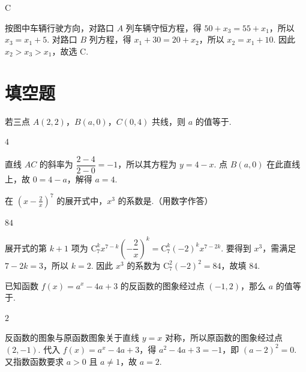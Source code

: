 \begin{answer}
C
\end{answer}

\begin{solution}
按图中车辆行驶方向，对路口 \(A\) 列车辆守恒方程，得 \(50+x_{3}=55+x_{1}\)，所以 \(x_{3}=x_{1}+5\). 对路口 \(B\) 列方程，得 \(x_{1}+30=20+x_{2}\)，所以 \(x_{2}=x_{1}+10\). 因此 \(x_{2}>x_{3}>x_{1}\)，故选 C.
\end{solution}

\section{填空题}
\begin{problem}
若三点 \(A(2,2)\)，\(B(a,0)\)，\(C(0,4)\) 共线，则 \(a\) 的值等于\fillinblank{}.
\end{problem}

\begin{answer}
\(4\)
\end{answer}

\begin{solution}
直线 \(AC\) 的斜率为 \(\dfrac{2-4}{2-0}=-1\)，所以其方程为 \(y=4-x\). 点 \(B(a,0)\) 在此直线上，故 \(0=4-a\)，解得 \(a=4\).
\end{solution}

\begin{problem}
在 \(\left(x - \frac{2}{x}\right)^7\) 的展开式中，\(x^3\) 的系数是\fillinblank{}.（用数字作答）
\end{problem}

\begin{answer}
\(84\)
\end{answer}

\begin{solution}
展开式的第 \(k+1\) 项为 \(\mathrm C_7^k x^{7-k}\left(-\dfrac{2}{x}\right)^k=\mathrm C_7^k(-2)^k x^{7-2k}\). 要得到 \(x^3\)，需满足 \(7-2k=3\)，所以 \(k=2\). 因此 \(x^3\) 的系数为 \(\mathrm C_7^2(-2)^2=84\)，故填 \(84\).
\end{solution}

\begin{problem}
已知函数 \( f(x) = a^x - 4a + 3 \) 的反函数的图象经过点 \((-1,2)\)，那么 \( a \) 的值等于\fillinblank{}.
\end{problem}

\begin{answer}
\(2\)
\end{answer}

\begin{solution}
反函数的图象与原函数图象关于直线 \(y=x\) 对称，所以原函数的图象经过点 \((2,-1)\). 代入 \(f(x)=a^x-4a+3\)，得 \(a^2-4a+3=-1\)，即 \((a-2)^2=0\). 又指数函数要求 \(a>0\) 且 \(a\ne1\)，故 \(a=2\).
\end{solution}

